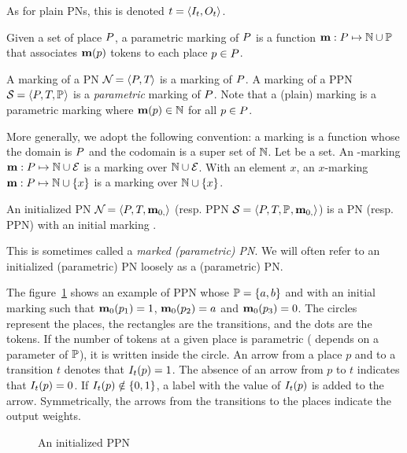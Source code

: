 As for plain \acp{PN}, this is denoted $t = \tuple{\inw[t], \outw[t]}$.

\begin{defi}
  Given a set of place $P$, a parametric marking of $P$ is a function $\mathbf{m} : P \mapsto \mathbb{N} \cup \mathbb{P}$ that associates $\mathbf{m}(p)$ tokens to each place $p \in P$.
\end{defi}

A marking of a \ac{PN} $\mathcal{N}_{} = \left\langle P_{}, T_{}\right\rangle$ is a marking of $P$.
A marking of a \ac{PPN} $\mathcal{S}_{} = \left\langle P_{}, T_{}, \mathbb{P}_{}\right\rangle$ is a \emph{parametric} marking of $P$.
Note that a (plain) marking \mar is a parametric marking where $\mathbf{m}(p) \in \mathbb{N}$ for all $p \in P$.

More generally, we adopt the following convention:
a marking is a function whose the domain is $P$ and the codomain is a super set of $\mathbb{N}$.
Let \set be a set. An \set-marking $\mathbf{m} : P \mapsto \mathbb{N} \cup \mathcal{E}$ is a marking over $\mathbb{N} \cup \mathcal{E}$.
With an element $x$, an $x$-marking $\mathbf{m} : P \mapsto \mathbb{N} \cup \{x\}$ is a marking over $\mathbb{N} \cup \{x\}$.

\begin{defi}
  An initialized \ac{PN} $\mathcal{N}_{} = \left\langle P_{}, T_{}, \mathbf{m}_{0,}\right\rangle$ (resp. \ac{PPN} $\mathcal{S}_{} = \left\langle P_{}, T_{}, \mathbb{P}_{}, \mathbf{m}_{0,}\right\rangle$) is a \ac{PN} (resp. \ac{PPN}) with an initial marking \mari.
\end{defi}

This is sometimes called a \emph{marked (parametric) \ac{PN}}.
We will often refer to an initialized (parametric) \ac{PN} loosely as a (parametric) \ac{PN}.

The figure~\ref{fig:parametric-petri-net-example} shows an example of \ac{PPN} whose $\parameters = \{\param[1], \param[2]\}$ and with an initial marking \mari such that $\mathbf{m}_0(p_1) = 1$, $\mari(p_2) = \param[1]$ and $\mathbf{m}_0(p_3) = 0$.
The circles represent the places, the rectangles are the transitions, and the dots are the tokens.
If the number of tokens at a given place is parametric ( depends on a parameter of $\mathbb{P}$), it is written inside the circle.
An arrow from a place $p$ and to a transition $t$ denotes that $\inw[t](p) = 1$.
The absence of an arrow from $p$ to $t$ indicates that $\inw[t](p) = 0$.
If $\inw[t](p) \notin \{0, 1\}$, a label with the value of $\inw[t](p)$ is added to the arrow.
Symmetrically, the arrows from the transitions to the places indicate the output weights.

\begin{figure}[htbp]
  \centering
  
  \par
  \caption{An initialized \ac{PPN}}
  \label{fig:parametric-petri-net-example}
\end{figure}

